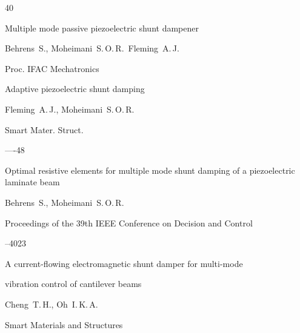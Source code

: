\begin{thebibliography}{40}




\paper Multiple mode passive piezoelectric shunt dampener

\by Behrens~S., Moheimani~S.\,O.\,R.\, Fleming~A.\,J.

\jour Proc. IFAC Mechatronics


\pages




\paper Adaptive piezoelectric shunt damping

\by Fleming~A.\,J., Moheimani~S.\,O.\,R.

\jour Smart Mater. Struct.




—-48




\paper Optimal resistive elements for multiple mode shunt damping of a piezoelectric laminate beam

\by Behrens~S., Moheimani~S.\,O.\,R.

\jour Proceedings of the 39th IEEE Conference on Decision and Control



--4023





\paper A current-flowing electromagnetic shunt damper for multi-mode

vibration control of cantilever beams

\by Cheng~T.\,H., Oh~I.\,K.\,A.

\jour Smart Materials and Structures










\end{thebibliography}
